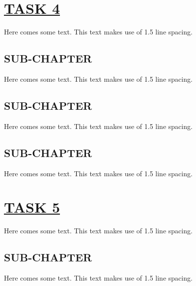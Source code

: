 \documentclass[fontsize=11pt]{scrartcl}
\begin{document}
\section{\uline{TASK 4}}
Here comes some text. This text makes use of 1.5 line spacing. 
\subsection{SUB-CHAPTER}
Here comes some text. This text makes use of 1.5 line spacing. 
\subsection{SUB-CHAPTER}
Here comes some text. This text makes use of 1.5 line spacing. 
\subsection{SUB-CHAPTER}
Here comes some text. This text makes use of 1.5 line spacing. 
\pagebreak
\section{\uline{TASK 5}}
Here comes some text. This text makes use of 1.5 line spacing. 
\subsection{SUB-CHAPTER}
Here comes some text. This text makes use of 1.5 line spacing. 
\end{document}
